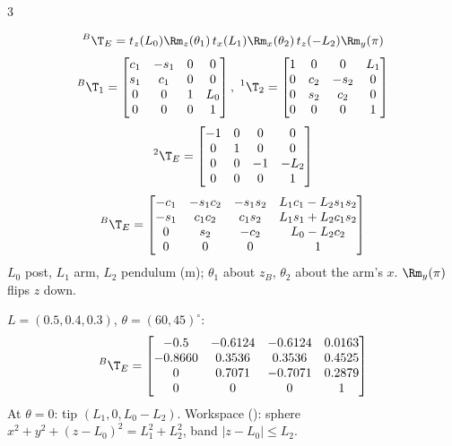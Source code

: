 \begin{multicols}{3}
\begin{fbx}
\[{}^B\T_E=t_z(L_0)\Rm_z(\theta_1)\,t_x(L_1)\Rm_x(\theta_2)\,t_z(-L_2)\Rm_y(\pi)\]
{\footnotesize\[{}^B\T_1=\begin{bmatrix}c_1&-s_1&0&0\\s_1&c_1&0&0\\0&0&1&L_0\\0&0&0&1\end{bmatrix},\ 
{}^1\T_2=\begin{bmatrix}1&0&0&L_1\\0&c_2&-s_2&0\\0&s_2&c_2&0\\0&0&0&1\end{bmatrix}\]
\[{}^2\T_E=\begin{bmatrix}-1&0&0&0\\0&1&0&0\\0&0&-1&-L_2\\0&0&0&1\end{bmatrix}\]}
\[{}^B\T_E=\begin{bmatrix}-c_1&-s_1c_2&-s_1s_2&L_1c_1-L_2s_1s_2\\-s_1&c_1c_2&c_1s_2&L_1s_1+L_2c_1s_2\\0&s_2&-c_2&L_0-L_2c_2\\0&0&0&1\end{bmatrix}\]
$L_0$ post, $L_1$ arm, $L_2$ pendulum (m); $\theta_1$ about $z_B$, $\theta_2$ about the arm's $x$. $\Rm_y(\pi)$ flips $z$ down.
\end{fbx}
\begin{worked}
$L=(0.5,0.4,0.3)$, $\theta=(60,45)^\circ$:
\[{}^B\T_E=\begin{bmatrix}-0.5&-0.6124&-0.6124&0.0163\\-0.8660&0.3536&0.3536&0.4525\\0&0.7071&-0.7071&0.2879\\0&0&0&1\end{bmatrix}\]
At $\theta=0$: tip $(L_1,0,L_0-L_2)$. Workspace (\added): sphere $x^2+y^2+(z-L_0)^2=L_1^2+L_2^2$, band $|z-L_0|\le L_2$. \chk
\end{worked}


\end{multicols}
